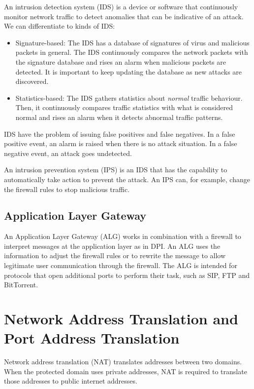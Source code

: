An intrusion detection system (IDS) is a device or software that continuously monitor network traffic to detect anomalies that can be indicative of an attack.
We can differentiate to kinds of IDS:
\begin{itemize}
\item Signature-based: The IDS has a database of signatures of virus and malicious packets in general.
The IDS continuously compares the network packets with the signature database and rises an alarm when malicious packets are detected.
It is important to keep updating the database as new attacks are discovered.
\item Statistics-based: The IDS gathers statistics about \emph{normal} traffic behaviour.
Then, it continuously compares traffic statistics with what is considered normal and rises an alarm when it detects abnormal traffic patterns.
\end{itemize}

IDS have the problem of issuing false positives and false negatives.
In a false positive event, an alarm is raised when there is no attack situation.
In a false negative event, an attack goes undetected.

An intrusion prevention system (IPS) is an IDS that has the capability to automatically take action to prevent the attack.
An IPS can, for example, change the firewall rules to stop malicious traffic.

\subsection{Application Layer Gateway}

An Application Layer Gateway (ALG) works in combination with a firewall to interpret messages at the application layer as in DPI.
An ALG uses the information to adjust the firewall rules or to rewrite the message to allow legitimate user communication through the firewall.
The ALG is intended for protocols that open additional ports to perform their task, such as SIP, FTP and BitTorrent.

\section{Network Address Translation and Port Address Translation}

Network address translation (NAT) translates addresses between two domains.
When the protected domain uses private addresses, NAT is required to translate those addresses to public internet addresses.

